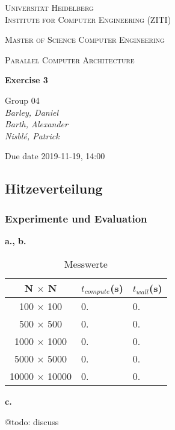 \documentclass[12pt]{article}
\newcommand{\lecture}{Parallel Computer Architecture}
\newcommand{\exercise}{Exercise 3}
\newcommand{\groupnumber}{Group 04}
\newcommand{\groupmemberslist}{Barley, Daniel\\Barth, Alexander\\Nisblé, Patrick}
\newcommand{\duedate}{2019-11-19, 14:00}
\begin{document}
	\begin{titlepage}
		\centering
		
		{\scshape\LARGE Universität Heidelberg\\Institute for Computer Engineering (ZITI) \par}
		\vspace{1.5cm}
		{\scshape\Large Master of Science Computer Engineering \par}
		\vspace{0.5cm}
		{\scshape\Large \lecture \par}
		\vspace{1.5cm}
		{\huge\bfseries \exercise \par}
		\vspace{2cm}
		{\Large \groupnumber \itshape  \\ \groupmemberslist \par}
		\vfill
		
		
		{\large Due date \duedate \par}
	\end{titlepage}
\setcounter{section}{3}
\subsection{Hitzeverteilung}

\setcounter{subsubsection}{1}

\subsubsection{Experimente und Evaluation}

\noindent \textbf{a., b.}

\begin{table}[ht]
	\centering
	\caption[Messwerte]{Messwerte}
	\begin{tabular}{c|l|l}
		\hline
		\cellcolor{gray!40}\textbf{N $\times$ N} & \multicolumn{1}{c}{\cellcolor{gray!40}\textbf{$t_{compute}$(\si{\second})}} & \multicolumn{1}{c}{\cellcolor{gray!40}\textbf{$t_{wall}$(\si{\second})}}\\
		\hline\hline
		100 $\times$ 100 & 0. & 0.\\\hline
		500 $\times$ 500 & 0. & 0.\\\hline
		1000 $\times$ 1000 & 0. & 0.\\\hline
		5000 $\times$ 5000 & 0. & 0.\\\hline
		10000 $\times$ 10000 & 0. & 0.\\\hline
	\end{tabular}
	\label{tab:values}
\end{table}

\noindent \textbf{c.}

@todo: discuss
\end{document}

